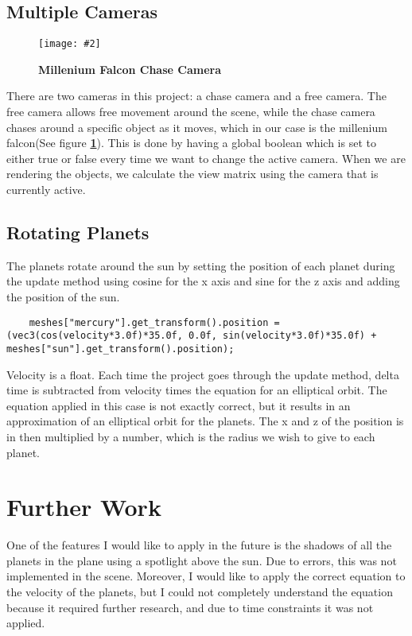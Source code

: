 \documentclass[10pt, a4paper]{article}
\newcommand{\figuremacro}[5]{
    \begin{figure}[#1]
        \centering
        \texttt{[image: \#2]}
        \caption[#3]{\textbf{#3}#4}
        \label{fig:#2}
    \end{figure}
}
\begin{document}
\subsection{Multiple Cameras}	
	
		\figuremacro{H}{Project_Falcon}{Millenium Falcon Chase Camera}{ }{1.0}
	
	There are two cameras in this project: a chase camera and a free camera. The free camera allows free movement around the scene, while the chase camera chases around a specific object as it moves, which in our case is the millenium falcon(See figure \textbf{\ref{fig:Project_Falcon}}). This is done by having a global boolean which is set to either true or false every time we want to change the active camera. When we are rendering the objects, we calculate the view matrix using the camera that is currently active. 
	
\subsection{Rotating Planets}	

	The planets rotate around the sun by setting the position of each planet during the update method using cosine for the x axis and sine for the z axis and adding the position of the sun.
	\begin{lstlisting}
	meshes["mercury"].get_transform().position = (vec3(cos(velocity*3.0f)*35.0f, 0.0f, sin(velocity*3.0f)*35.0f) + meshes["sun"].get_transform().position); 
	\end{lstlisting}
	 Velocity is a float. Each time the project goes through the update method, delta time is subtracted from velocity times the equation for an elliptical orbit. The equation applied in this case is not exactly correct, but it results in an approximation of an elliptical orbit for the planets. The x and z of the position is in then multiplied by a number, which is the radius we wish to give to each planet.
	 
\section{Further Work}	 
	
	One of the features I would like to apply in the future is the shadows of all the planets in the plane using a spotlight above the sun. Due to errors, this was not implemented in the scene. Moreover, I would like to apply the correct equation to the velocity of the planets, but I could not completely understand the equation because it required further research, and due to time constraints it was not applied.
	
\end{document}
